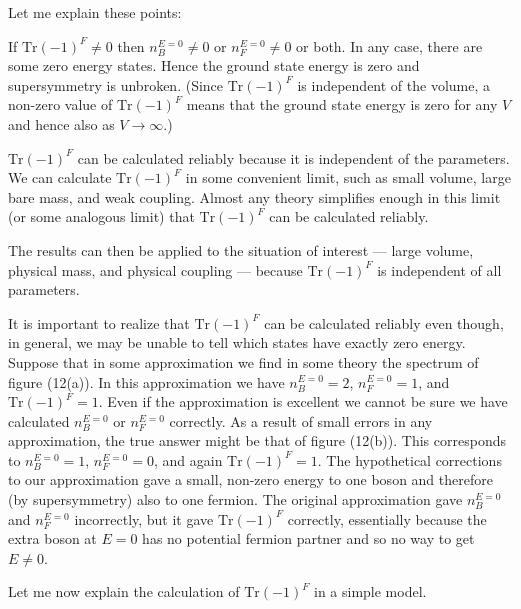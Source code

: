 \documentclass[11pt,a4paper]{article}
\begin{document}
\begingroup
\renewcommand{\thefootnote}{\fnsymbol{footnote}}
\endgroup

Let me explain these points:

If $\mathrm{Tr}(-1)^F \neq 0$ then $n_B^{E=0} \neq 0$ or $n_F^{E=0} \neq 0$ or both. In any case,
there are some zero energy states. Hence the ground state energy is
zero and supersymmetry is unbroken. (Since $\mathrm{Tr}(-1)^F$ is independent of
the volume, a non-zero value of $\mathrm{Tr}(-1)^F$ means that the ground state
energy is zero for any $V$ and hence also as $V \to \infty$.)

$\mathrm{Tr}(-1)^F$ can be calculated reliably because it is independent of
the parameters. We can calculate $\mathrm{Tr}(-1)^F$ in some convenient limit,
such as small volume, large bare mass, and weak coupling. Almost any
theory simplifies enough in this limit (or some analogous limit) that
$\mathrm{Tr}(-1)^F$ can be calculated reliably.

The results can then be applied to the situation of interest ---
large volume, physical mass, and physical coupling --- because $\mathrm{Tr}(-1)^F$
is independent of all parameters.

It is important to realize that $\mathrm{Tr}(-1)^F$ can be calculated
reliably even though, in general, we may be unable to tell which
states have exactly zero energy. Suppose that in some approximation
we find in some theory the spectrum of figure (12(a)). In this approximation
we have $n_B^{E=0} = 2$, $n_F^{E=0} = 1$, and $\mathrm{Tr}(-1)^F = 1$. Even if
the approximation is excellent we cannot be sure we have calculated
$n_B^{E=0}$ or $n_F^{E=0}$ correctly. As a result of small errors in any approximation,
the true answer might be that of figure (12(b)). This corresponds
to $n_B^{E=0} = 1$, $n_F^{E=0} = 0$, and again $\mathrm{Tr}(-1)^F = 1$. The hypothetical
corrections to our approximation gave a small, non-zero
energy to one boson and therefore (by supersymmetry) also to one
fermion. The original approximation gave $n_B^{E=0}$ and $n_F^{E=0}$ incorrectly,
but it gave $\mathrm{Tr}(-1)^F$ correctly, essentially because the extra boson at
$E = 0$ has no potential fermion partner and so no way to get $E \neq 0$.

Let me now explain the calculation of $\mathrm{Tr}(-1)^F$ in a simple model.
\end{document}
